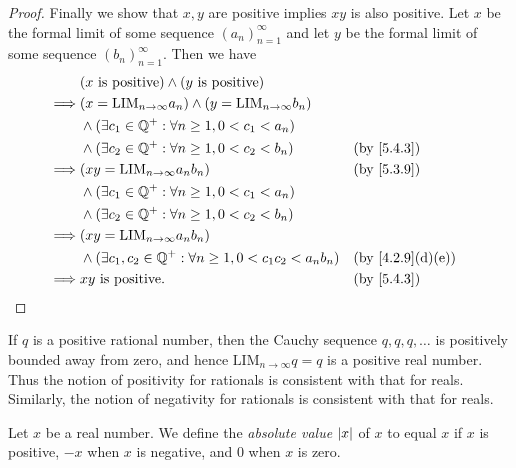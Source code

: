\begin{proof}
	Finally we show that \(x, y\) are positive implies \(xy\) is also positive.
	Let \(x\) be the formal limit of some sequence \((a_n)_{n = 1}^{\infty}\) and let \(y\) be the formal limit of some sequence \((b_n)_{n = 1}^{\infty}\).
	Then we have
	\begin{align*}
		         & (x \text{ is positive}) \land (y \text{ is positive})                                                             \\
		\implies & (x = \text{LIM}_{n \to \infty} a_n) \land (y = \text{LIM}_{n \to \infty} b_n)                                     \\
		         & \land (\exists c_1 \in \Q^+ : \forall n \geq 1, 0 < c_1 < a_n)                                                    \\
		         & \land (\exists c_2 \in \Q^+ : \forall n \geq 1, 0 < c_2 < b_n)                &  & \by{5.4.3}                     \\
		\implies & (xy = \text{LIM}_{n \to \infty} a_n b_n)                                      &  & \by{5.3.9}                     \\
		         & \land (\exists c_1 \in \Q^+ : \forall n \geq 1, 0 < c_1 < a_n)                                                    \\
		         & \land (\exists c_2 \in \Q^+ : \forall n \geq 1, 0 < c_2 < b_n)                                                    \\
		\implies & (xy = \text{LIM}_{n \to \infty} a_n b_n)                                                                          \\
		         & \land (\exists c_1, c_2 \in \Q^+ : \forall n \geq 1, 0 < c_1 c_2 < a_n b_n)   &  & \text{(by \cref{4.2.9}(d)(e))} \\
		\implies & xy \text{ is positive}.                                                       &  & \by{5.4.3}
	\end{align*}
\end{proof}

\begin{note}
	If \(q\) is a positive rational number, then the Cauchy sequence \(q, q, q, \dots\) is positively bounded away from zero, and hence \(\text{LIM}_{n \to \infty} q = q\) is a positive real number.
	Thus the notion of positivity for rationals is consistent with that for reals.
	Similarly, the notion of negativity for rationals is consistent with that for reals.
\end{note}

\begin{defn}\label{5.4.5}
	Let \(x\) be a real number.
	We define the \emph{absolute value} \(\left\lvert x\right\rvert\) of \(x\) to equal \(x\) if \(x\) is positive, \(-x\) when \(x\) is negative, and \(0\) when \(x\) is zero.
\end{defn}

